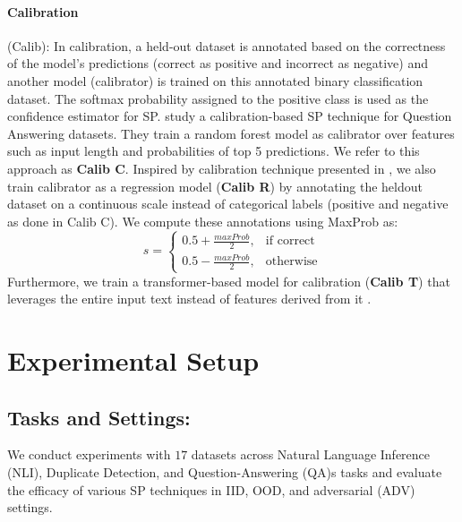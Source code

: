 \documentclass[11pt]{article}
\begin{document}
\paragraph{Calibration} (Calib):
In calibration, a held-out dataset is annotated based on the correctness of the model's predictions (correct as positive and incorrect as negative) and another model (calibrator) is trained on this annotated binary classification dataset.
The softmax probability assigned to the positive class is used as the confidence estimator for SP.
\citet{kamath-etal-2020-selective} study a calibration-based SP technique for Question Answering datasets.
They train a random forest model as calibrator over features such as input length and probabilities of top 5 predictions.
We refer to this approach as \textbf{Calib C}.
Inspired by calibration technique presented in \citet{10.1162/tacl_a_00407}, we also train calibrator as a regression model (\textbf{Calib R}) by annotating the heldout dataset on a continuous scale instead of categorical labels (positive and negative as done in Calib C).
We compute these annotations using MaxProb as:
\begin{equation*}
        s =
            \begin{cases}
              0.5+ \frac{maxProb}{2}, & \text{if correct} \\
              0.5- \frac{maxProb}{2}, & \text{otherwise}
            \end{cases}
\end{equation*}
Furthermore, we train a transformer-based model for calibration (\textbf{Calib T}) that leverages the entire input text instead of features derived from it \cite{garg2021will}.



\section{Experimental Setup}
\label{sec_experimental_setup}
\subsection{Tasks and Settings:}
We conduct experiments with $17$ datasets across Natural Language Inference (NLI), Duplicate Detection, and Question-Answering (QA)s tasks and evaluate the efficacy of various SP techniques in IID, OOD, and adversarial (ADV) settings.
\end{document}
